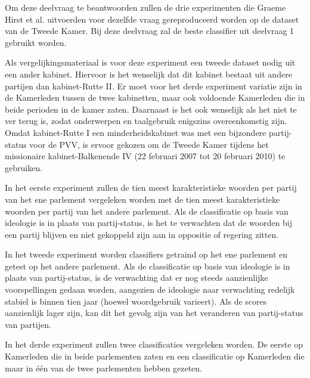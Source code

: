 Om deze deelvraag te beantwoorden zullen de drie experimenten die Graeme Hirst et al. uitvoerden voor dezelfde vraag gereproduceerd worden op de dataset van de Tweede Kamer. Bij deze deelvraag zal de beste classifier uit deelvraag 1 gebruikt worden. \par
Als vergelijkingsmateriaal is voor deze experiment een tweede dataset nodig uit een ander kabinet. Hiervoor is het wenselijk dat dit kabinet bestaat uit andere partijen dan kabinet-Rutte II. Er moet voor het derde experiment variatie zijn in de Kamerleden tussen de twee kabinetten, maar ook voldoende Kamerleden die in beide perioden in de kamer zaten. Daarnaast is het ook wenselijk als het niet te ver terug is, zodat onderwerpen en taalgebruik enigszins overeenkomstig zijn. Omdat kabinet-Rutte I een minderheidskabinet was met een bijzondere partij-status voor de PVV, is ervoor gekozen om de Tweede Kamer tijdens het missionaire kabinet-Balkenende IV (22 februari 2007 tot 20 februari 2010) te gebruiken.\par
In het eerste experiment zullen de tien meest karakteristieke woorden per partij van het ene parlement vergeleken worden met de tien meest karakteristieke woorden per partij van het andere parlement. Als de classificatie op basis van ideologie is in plaats van partij-status, is het te verwachten dat de woorden bij een partij blijven en niet gekoppeld zijn aan in oppositie of regering zitten. \par
In het tweede experiment worden classifiers getraind op het ene parlement en getest op het andere parlement. Als de classificatie op basis van ideologie is in plaats van partij-status, is de verwachting dat er nog steeds aanzienlijke voorspellingen gedaan worden, aangezien de ideologie naar verwachting redelijk stabiel is binnen tien jaar (hoewel woordgebruik varieert). Als de scores aanzienlijk lager zijn, kan dit het gevolg zijn van het veranderen van partij-status van partijen.\par
In het derde experiment zullen twee classificaties vergeleken worden. De eerste op Kamerleden die in beide parlementen zaten en een classificatie op Kamerleden die maar in één van de twee parlementen hebben gezeten.\par
